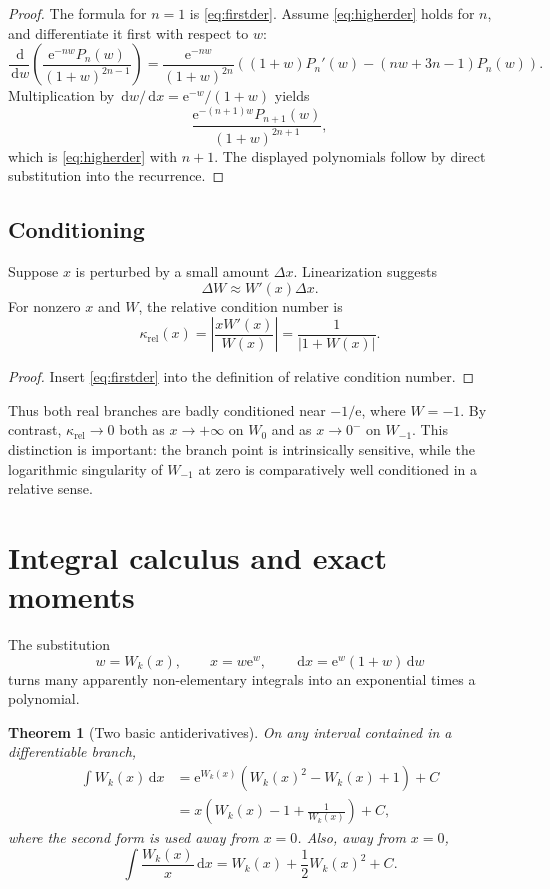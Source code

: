 \documentclass[11pt]{article}
\newtheorem{theorem}{Theorem}[section]
\theoremstyle{remark}
\newcommand{\Wz}{W_0}
\newcommand{\Wm}{W_{-1}}
\newcommand{\ee}{\mathrm e}
\newcommand{\abs}[1]{\left|#1\right|}
\newcommand{\dd}{\,\mathrm d}
\begin{document}
\begin{proof}
The formula for \(n=1\) is \eqref{eq:firstder}.  Assume
\eqref{eq:higherder} holds for \(n\), and differentiate it first with
respect to \(w\):
\[
 \frac{\dd}{\dd w}
 \left(\frac{\ee^{-nw}P_n(w)}{(1+w)^{2n-1}}\right)
 =
 \frac{\ee^{-nw}}{(1+w)^{2n}}
 \left((1+w)P_n'(w)-(nw+3n-1)P_n(w)\right).
\]
Multiplication by
\(\dd w/\dd x=\ee^{-w}/(1+w)\) yields
\[
 \frac{\ee^{-(n+1)w}P_{n+1}(w)}
 {(1+w)^{2n+1}},
\]
which is \eqref{eq:higherder} with \(n+1\).  The displayed polynomials follow
by direct substitution into the recurrence.
\end{proof}

\subsection{Conditioning}

Suppose \(x\) is perturbed by a small amount \(\Delta x\).  Linearization
suggests
\[
       \Delta W\approx W'(x)\Delta x.
\]
For nonzero \(x\) and \(W\), the relative condition number is
\begin{equation}\label{eq:condition}
 \kappa_{\mathrm{rel}}(x)
 =\abs{\frac{xW'(x)}{W(x)}}
 =\frac1{\abs{1+W(x)}}.
\end{equation}

\begin{proof}
Insert \eqref{eq:firstder} into the definition of relative condition number.
\end{proof}

Thus both real branches are badly conditioned near \(-1/\ee\), where
\(W=-1\).  By contrast, \(\kappa_{\mathrm{rel}}\to0\) both as
\(x\to+\infty\) on \(\Wz\) and as \(x\to0^-\) on \(\Wm\).  This distinction
is important: the branch point is intrinsically sensitive, while the
logarithmic singularity of \(\Wm\) at zero is comparatively well conditioned
in a relative sense.


\section{Integral calculus and exact moments}\label{sec:integrals}

The substitution
\[
       w=W_k(x),\qquad x=w\ee^w,\qquad
       \dd x=\ee^w(1+w)\dd w
\]
turns many apparently non-elementary integrals into an exponential times a
polynomial.

\begin{theorem}[Two basic antiderivatives]\label{thm:antiderivatives}
On any interval contained in a differentiable branch,
\begin{align}
 \int W_k(x)\dd x
   &=\ee^{W_k(x)}
       \left(W_k(x)^2-W_k(x)+1\right)+C\label{eq:intW}\\
   &=x\left(W_k(x)-1+\frac1{W_k(x)}\right)+C,\label{eq:intW-x}
\end{align}
where the second form is used away from \(x=0\).  Also, away from \(x=0\),
\begin{equation}\label{eq:intWoverx}
 \int\frac{W_k(x)}x\dd x
    =W_k(x)+\frac12W_k(x)^2+C.
\end{equation}
\end{theorem}
\end{document}
